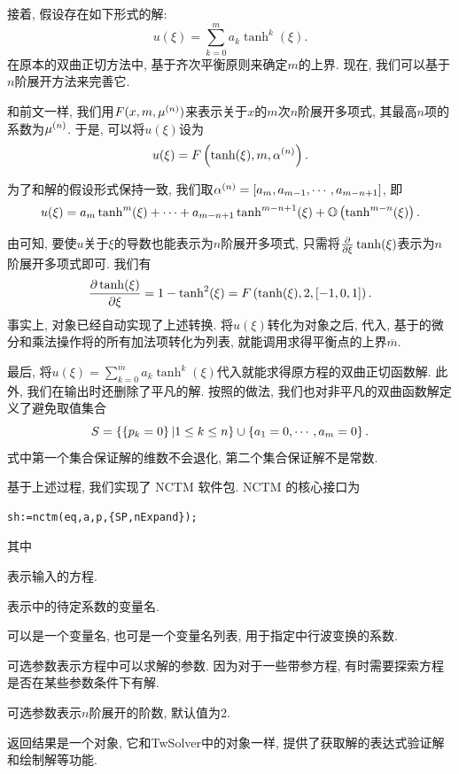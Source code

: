 接着, 假设存在如下形式的解:
\begin{equation}
    u(\xi)=\sum_{k=0}^m{a_k \tanh^k(\xi)}. \label{tanh-poly}
\end{equation}
在原本的双曲正切方法中, 基于齐次平衡原则来确定$m$的上界. 现在, 我们可以基于$n$阶展开方法来完善它. 

和前文一样, 我们用$F(x,m,\mu^{(n)})$来表示关于$x$的$m$次$n$阶展开多项式, 其最高$n$项的系数为$\mu^{(n)}$. 于是, 可以将$u(\xi)$设为
\begin{equation}
    u(\xi)=F\left(\tanh(\xi),m,\alpha^{(n)}\right).
\end{equation}

为了和解的假设形式保持一致, 我们取$\alpha^{(n)}=[a_m,a_{m-1},\cdots,a_{m-n+1}]$, 即
\begin{equation}
    u(\xi)=a_m\tanh^m(\xi)+\cdots+a_{m-n+1}\tanh^{m-n+1}(\xi)+\mathbb O\left(\tanh^{m-n}(\xi)\right).
\end{equation}

由可知, 要使$u$关于$\xi$的导数也能表示为$n$阶展开多项式, 只需将$\frac{\partial}{\partial \xi}\tanh(\xi)$表示为$n$阶展开多项式即可. 我们有 
\begin{equation}
    \frac{\partial \tanh(\xi)}{\partial \xi}=1-\tanh^2(\xi)=F\left(\tanh(\xi),2,[-1,0,1]\right).
\end{equation}
事实上, 对象已经自动实现了上述转换. 将$u(\xi)$转化为对象之后, 代入, 基于的微分和乘法操作将的所有加法项转化为列表, 就能调用求得平衡点的上界$\overline{m}$.

最后, 将$u(\xi)=\sum_{k=0}^{\overline{m}}{a_k \tanh^k(\xi)}$代入就能求得原方程的双曲正切函数解.  此外, 我们在输出时还删除了平凡的解. 按照的做法, 我们也对非平凡的双曲函数解定义了避免取值集合
\begin{equation}
    S=\left\{\left\{p_k=0\right\}|1\le k \le n\right\} \cup \left\{a_1=0,\cdots,a_m=0\right\}.
\end{equation}
式中第一个集合保证解的维数不会退化, 第二个集合保证解不是常数. 

基于上述过程, 我们实现了 NCTM 软件包. NCTM 的核心接口为
\begin{verbatim}
sh:=nctm(eq,a,p,{SP,nExpand});
\end{verbatim}
其中
\begin{compactitem}[\textbullet]
\item {} 表示输入的方程.
\item {} 表示中的待定系数的变量名.
\item {} 可以是一个变量名, 也可是一个变量名列表, 用于指定中行波变换的系数.
\item 可选参数表示方程中可以求解的参数. 因为对于一些带参方程, 有时需要探索方程是否在某些参数条件下有解.
\item 可选参数表示$n$阶展开的阶数, 默认值为2.
\item 返回结果是一个对象, 它和TwSolver中的对象一样, 提供了获取解的表达式\D 验证解和绘制解等功能. 
\end{compactitem}

